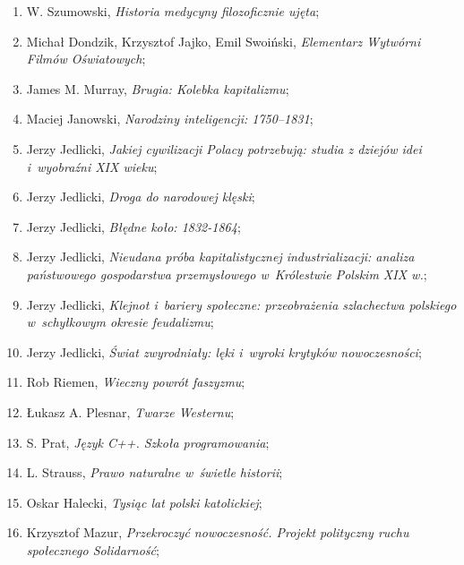 \documentclass[a4paper,11pt]{article}
\begin{document}
\begin{enumerate}
\item W. Szumowski, \textit{Historia medycyny filozoficznie ujęta};

\item Michał Dondzik, Krzysztof Jajko, Emil Swoiński, \textit{Elementarz
    Wytwórni Filmów Oświatowych};

\item James M. Murray, \textit{Brugia: Kolebka kapitalizmu};

\item Maciej Janowski, \textit{Narodziny inteligencji: 1750--1831};

\item Jerzy Jedlicki, \textit{Jakiej cywilizacji Polacy potrzebują:
    studia z dziejów idei i~wyobraźni XIX wieku};

\item Jerzy Jedlicki, \textit{Droga do narodowej klęski};

\item Jerzy Jedlicki, \textit{Błędne koło: 1832-1864};

\item Jerzy Jedlicki, \textit{Nieudana próba kapitalistycznej
    industrializacji: analiza państwowego gospodarstwa przemysłowego
    w~Królestwie Polskim XIX w.};

\item Jerzy Jedlicki, \textit{Klejnot i~bariery społeczne: przeobrażenia
    szlachectwa polskiego w~schyłkowym okresie feudalizmu};

\item Jerzy Jedlicki, \textit{Świat zwyrodniały: lęki i~wyroki krytyków
    nowoczesności};

\item Rob Riemen, \textit{Wieczny powrót faszyzmu};

\item Łukasz A. Plesnar, \textit{Twarze Westernu};

\item S. Prat, \textit{Język C++. Szkoła programowania};

\item L. Strauss, \textit{Prawo naturalne w~świetle historii};

\item Oskar Halecki, \textit{Tysiąc lat polski katolickiej};

\item Krzysztof Mazur, \textit{Przekroczyć nowoczesność. Projekt
    polityczny ruchu społecznego Solidarność};


\end{enumerate}
\end{document}
